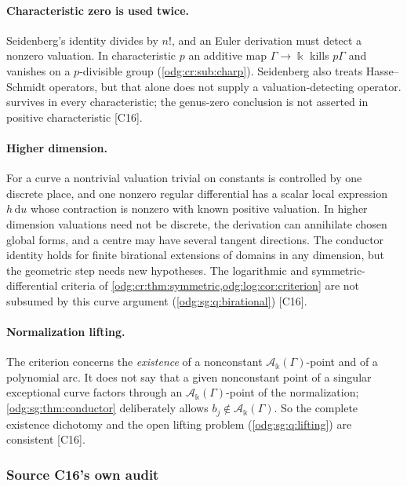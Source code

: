 \documentclass[11pt,oneside]{article}
\numberwithin{equation}{section}
\theoremstyle{definition}
\theoremstyle{remark}
\newcommand{\src}[1]{\textup{\textsf{\small[#1]}}}
\newcommand{\crA}{\mathcal A_\Bbbk(\Gamma)}
\newcommand{\dif}{\mathrm d}
\begin{document}
\paragraph{Characteristic zero is used twice.} Seidenberg's identity divides by $n!$, and an
Euler derivation must detect a nonzero valuation. In characteristic $p$ an additive map
$\Gamma\to\Bbbk$ kills $p\Gamma$ and vanishes on a $p$-divisible group
(\cref{odg:cr:sub:charp}). Seidenberg also treats Hasse--Schmidt operators, but that alone
does not supply a valuation-detecting operator.  survives in
every characteristic; the genus-zero conclusion is not asserted in positive
characteristic \src{C16}.

\paragraph{Higher dimension.} For a curve a nontrivial valuation trivial on constants is
controlled by one discrete place, and one nonzero regular differential has a scalar local
expression $h\,\dif u$ whose contraction is nonzero with known positive valuation. In
higher dimension valuations need not be discrete, the derivation can annihilate chosen
global forms, and a centre may have several tangent directions. The conductor identity
holds for finite birational extensions of domains in any dimension, but the geometric step
needs new hypotheses. The logarithmic and symmetric-differential criteria of
\cref{odg:cr:thm:symmetric,odg:log:cor:criterion} are not subsumed by this curve argument
(\cref{odg:sg:q:birational}) \src{C16}.

\paragraph{Normalization lifting.} The criterion concerns the \emph{existence} of a
nonconstant $\crA$-point and of a polynomial arc. It does not say that a given nonconstant
point of a singular exceptional curve factors through an $\crA$-point of the normalization;
\cref{odg:sg:thm:conductor} deliberately allows $b_j\notin\crA$. So the complete existence
dichotomy and the open lifting problem (\cref{odg:sg:q:lifting}) are consistent \src{C16}.

\subsubsection{Source C16's own audit}\label{odg:sg:sub:audit}
\end{document}
